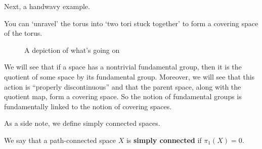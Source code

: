 Next, a handwavy example.

\begin{boxexample}
    You can `unravel' the torus into `two tori stuck together' to form a covering space of the torus.
    \begin{figure}[H]
        \centering
        \begin{subfigure}{0.45\linewidth}
            \centering
        \end{subfigure}
        \hfill
        \begin{subfigure}{0.45\linewidth}
            \centering
        \end{subfigure}
        \caption{A depiction of what's going on}
    \end{figure}
\end{boxexample}

We will see that if a space has a nontrivial fundamental group, then it is the quotient of some space by its fundamental group. Moreover, we will see that this action is ``properly discontinuous'' and that the parent space, along with the quotient map, form a covering space. So the notion of fundamental groups is fundamentally linked to the notion of covering spaces.

As a side note, we define simply connected spaces.

\begin{boxdefinition}
    We say that a path-connected space $X$ is \textbf{simply connected} if $\pi_1(X)=0$.
\end{boxdefinition}

